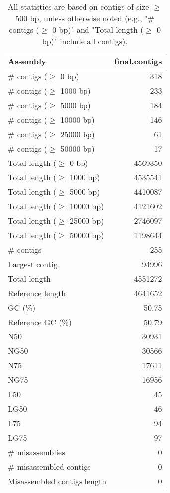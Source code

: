 \documentclass[12pt,a4paper]{article}
\begin{document}
\begin{table}[ht]
\begin{center}
\caption{All statistics are based on contigs of size $\geq$ 500 bp, unless otherwise noted (e.g., "\# contigs ($\geq$ 0 bp)" and "Total length ($\geq$ 0 bp)" include all contigs).}
\begin{tabular}{|l*{1}{|r}|}
\hline
Assembly & final.contigs \\ \hline
\# contigs ($\geq$ 0 bp) & 318 \\ \hline
\# contigs ($\geq$ 1000 bp) & 233 \\ \hline
\# contigs ($\geq$ 5000 bp) & 184 \\ \hline
\# contigs ($\geq$ 10000 bp) & 146 \\ \hline
\# contigs ($\geq$ 25000 bp) & 61 \\ \hline
\# contigs ($\geq$ 50000 bp) & 17 \\ \hline
Total length ($\geq$ 0 bp) & 4569350 \\ \hline
Total length ($\geq$ 1000 bp) & 4535541 \\ \hline
Total length ($\geq$ 5000 bp) & 4410087 \\ \hline
Total length ($\geq$ 10000 bp) & 4121602 \\ \hline
Total length ($\geq$ 25000 bp) & 2746097 \\ \hline
Total length ($\geq$ 50000 bp) & 1198644 \\ \hline
\# contigs & 255 \\ \hline
Largest contig & 94996 \\ \hline
Total length & 4551272 \\ \hline
Reference length & 4641652 \\ \hline
GC (\%) & 50.75 \\ \hline
Reference GC (\%) & 50.79 \\ \hline
N50 & 30931 \\ \hline
NG50 & 30566 \\ \hline
N75 & 17611 \\ \hline
NG75 & 16956 \\ \hline
L50 & 45 \\ \hline
LG50 & 46 \\ \hline
L75 & 94 \\ \hline
LG75 & 97 \\ \hline
\# misassemblies & 0 \\ \hline
\# misassembled contigs & 0 \\ \hline
Misassembled contigs length & 0 \\ \hline

\end{tabular}
\end{center}
\end{table}
\end{document}
